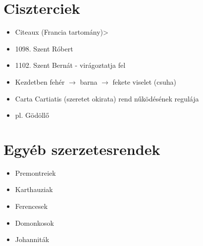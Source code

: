 \documentclass{article}
\begin{document}
\section{Ciszterciek}
\begin{itemize}
    \item Citeaux (Francia tartomány)> 
     \item 1098. Szent Róbert
     \item 1102. Szent Bernát - virágoztatja fel
     \item Kezdetben fehér $\rightarrow$ barna $\rightarrow$ fekete viselet (csuha)
     \item Carta Cartiatis (szeretet okirata) rend nűködésének regulája
     \item pl. Gödöllő
\end{itemize}

\section{Egyéb szerzetesrendek}
\begin{itemize}
    \item Premontreiek
    \item Karthauziak
    \item Ferencesek
    \item Domonkosok
    \item Johanniták
\end{itemize}
\end{document}
